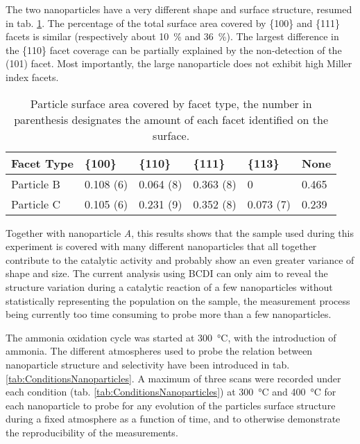 The two nanoparticles have a very different shape and surface structure, resumed in tab. \ref{tab:FacetCoverage}.
The percentage of the total surface area covered by \{100\} and \{111\} facets is similar (respectively about \qty{10}{\percent} and \qty{36}{\percent}).
The largest difference in the \{110\} facet coverage can be partially explained by the non-detection of the (101) facet.
Most importantly, the large nanoparticle does not exhibit high Miller index facets.

\begin{table}[!htb]
    \centering
    \begin{tabular}{@{}llllll@{}}
    \toprule
    Facet Type & \{100\} & \{110\} & \{111\} & \{113\} & None \\ \midrule
    Particle B & 0.108 (6) & 0.064 (8) & 0.363 (8) & 0 & 0.465 \\
    Particle C & 0.105 (6) & 0.231 (9) & 0.352 (8) & 0.073 (7) & 0.239 \\ \bottomrule
    \end{tabular}%
    \caption{
        Particle surface area covered by facet type, the number in parenthesis designates the amount of each facet identified on the surface.
    }
    \label{tab:FacetCoverage}
\end{table}

Together with nanoparticle \textit{A}, this results shows that the sample used during this experiment is covered with many different nanoparticles that all together contribute to the catalytic activity and probably show an even greater variance of shape and size.
The current analysis using BCDI can only aim to reveal the structure variation during a catalytic reaction of a few nanoparticles without statistically representing the population on the sample, the measurement process being currently too time consuming to probe more than a few nanoparticles.

The ammonia oxidation cycle was started at \qty{300}{\degreeCelsius}, with the introduction of ammonia.
The different atmospheres used to probe the relation between nanoparticle structure and selectivity have been introduced in tab. \ref{tab:ConditionsNanoparticles}.
A maximum of three scans were recorded under each condition (tab. \ref{tab:ConditionsNanoparticles}) at \qty{300}{\degreeCelsius} and \qty{400}{\degreeCelsius} for each nanoparticle to probe for any evolution of the particles surface structure during a fixed atmosphere as a function of time, and to otherwise demonstrate the reproducibility of the measurements.

